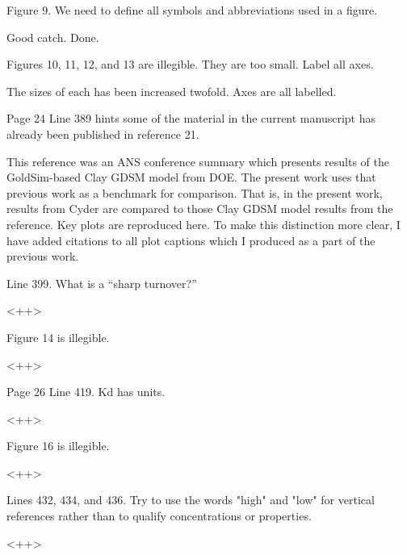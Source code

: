 \documentclass[answers,12pt]{exam}
\begin{document}
\begin{questions}
 

\question Figure 9. We need to define all symbols and abbreviations used in a figure.
\begin{solution}
Good catch. Done.
\end{solution}

 

\question Figures 10, 11, 12, and 13 are illegible. They are too small. Label all axes.
\begin{solution}
The sizes of each has been increased twofold. Axes are all labelled. 
\end{solution}

\question Page 24 Line 389 hints some of the material in the current manuscript has already been published in reference 21.
\begin{solution}
        This reference was an ANS conference summary which presents results of 
        the GoldSim-based Clay GDSM model from DOE. The present work uses that 
        previous work as a benchmark for comparison. That is, in the present 
        work, results from Cyder are compared to those Clay GDSM model results 
        from the reference. Key plots are reproduced here. To make this 
        distinction more clear, I have added citations to all plot captions 
        which I produced as a part of the previous work.
\end{solution}


\question Line 399. What is a “sharp turnover?”
\begin{solution}
<++>
\end{solution}

 

\question Figure 14 is illegible.
\begin{solution}
<++>
\end{solution}

 

\question Page 26 Line 419. Kd has units.
\begin{solution}
<++>
\end{solution}

 

\question Figure 16 is illegible.
\begin{solution}
<++>
\end{solution}

 

\question Lines 432, 434, and 436. Try to use the words "high" and "low" for vertical references rather than to qualify concentrations or properties.
\begin{solution}
<++>
\end{solution}


\end{questions}
\end{document}
